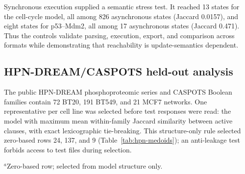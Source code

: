 \documentclass{ws-jbcb}
\numberwithin{equation}{section}
\begin{document}
\begin{table}[t]
\end{table}

Synchronous execution supplied a semantic stress test. It reached 13 states for
the cell-cycle model, all among 826 asynchronous states (Jaccard 0.0157), and
eight states for p53--Mdm2, all among 17 asynchronous states (Jaccard 0.471).
Thus the controls validate parsing, execution, export, and comparison across
formats while demonstrating that reachability is update-semantics dependent.

\subsection{HPN-DREAM/CASPOTS held-out analysis}\label{sec:hpn-method}

The public HPN-DREAM phosphoproteomic series and CASPOTS Boolean families contain
72 BT20, 191 BT549, and 21 MCF7 networks.\cite{Hill2016,Razzaq2018} One
representative per cell line was selected before test responses were read: the
model with maximum mean within-family Jaccard similarity between active clauses,
with exact lexicographic tie-breaking. This structure-only rule selected
zero-based rows 24, 137, and 9 (Table~\ref{tab:hpn-medoids}); an anti-leakage test
forbids access to test files during selection.

\begin{table}[t]
\begin{tabnote}$^a$Zero-based row; selected from model structure only.\end{tabnote}
\end{table}
\end{document}
